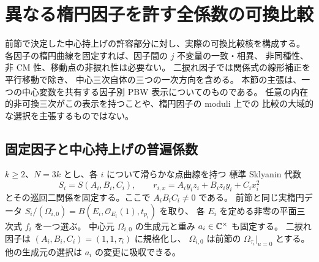 \section{異なる楕円因子を許す全係数の可換比較}
\label{emc:sec:elliptic-comparison}

前節で決定した中心持上げの許容部分に対し、実際の可換比較核を構成する。
各因子の楕円曲線を固定すれば、因子間の $j$ 不変量の一致・相異、
非同種性、非 CM 性、移動点の非捩れ性は必要ない。
二捩れ因子では関係式の線形補正を平行移動で除き、
中心三次自体の三つの一次方向を含める。
本節の主張は、一つの中心変数を共有する因子別 PBW 表示についてのものである。
任意の内在的非可換三次がこの表示を持つことや、楕円因子の moduli 上での
比較の大域的な選択を主張するものではない。

\subsection{固定因子と中心持上げの普遍係数}

$k\ge2$、$N=3k$ とし、各 $i$ について滑らかな点曲線を持つ
標準 Sklyanin 代数
\[
 S_i=S(A_i,B_i,C_i),\qquad
 r_{i,x}=A_i y_i z_i+B_i z_i y_i+C_i x_i^2
\]
とその巡回二関係を固定する。ここで $A_iB_iC_i\ne0$ である。
前節と同じ実楕円データ
$S_i/(\Omega_{i,0})=B(E_i,\mathcal O_{E_i}(1),t_{p_i})$ を取り、
各 $E_i$ を定める非零の平面三次式 $f_i$ を一つ選ぶ。
中心元 $\Omega_{i,0}$ の生成元と重み $a_i\in\mathbb C^\times$ も固定する。
二捩れ因子は $(A_i,B_i,C_i)=(1,1,\tau_i)$ に規格化し、
$\Omega_{i,0}$ は前節の $\Omega_{\tau_i}|_{u=0}$ とする。
他の生成元の選択は $a_i$ の変更に吸収できる。


